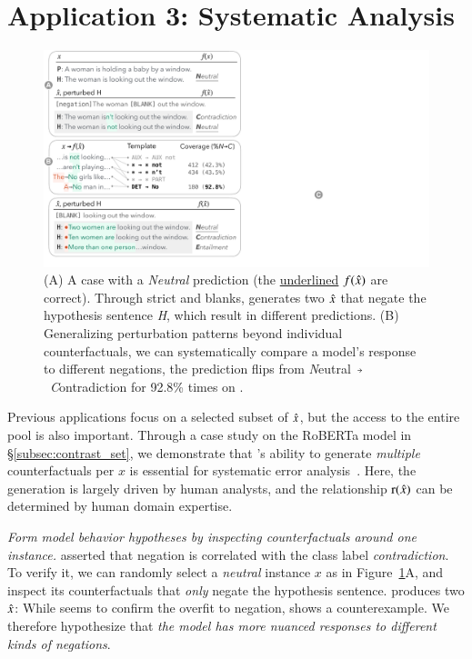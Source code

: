 \section{Application 3: Systematic Analysis}
\label{sec:app_err_analysis}


\begin{figure}[t]
\centering
\includegraphics[trim={0 12.5cm 33cm 0cm},clip,width=1\columnwidth]{figures/err_analysis.pdf}
\vspace{-15pt}
\caption{
(A) A \nli case with a \emph{Neutral} prediction (the \uline{underlined} $f(\hat{x})$ are correct).
Through strict \tagstrs and blanks, \sysname generates two $\hat{x}$ that negate the hypothesis sentence \emph{H}, which result in different predictions.
(B) Generalizing perturbation patterns beyond individual counterfactuals, we can systematically compare a model's response to different negations, \eg the prediction flips from \emph{N}eutral~$\veryshortarrow$~\emph{C}ontradiction for 92.8\% times on .
}
\vspace{-10pt}
\label{fig:err_analysis}
\end{figure}


Previous applications focus on a selected subset of $\hat{x}$, but the access to the entire pool is also important.
Through a case study on the \nli RoBERTa model in \S\ref{subsec:contrast_set}, we demonstrate that \sysname's ability to generate \emph{multiple} counterfactuals per $x$ is essential for systematic error analysis~\cite{wu2019errudite}.
Here, the generation is largely driven by human analysts, and the relationship $\operatorname*{r}(\hat{x})$ can be determined by human domain expertise.


\emph{Form model behavior hypotheses by inspecting counterfactuals around one instance.}
\citet{gururangan2018annotation} asserted that negation is correlated with the class label \emph{contradiction}. 
To verify it, we can randomly select a \emph{neutral} instance $x$ as in Figure~\ref{fig:err_analysis}A, and inspect its counterfactuals that \emph{only} negate the hypothesis sentence.
\sysname produces two $\hat{x}$:
While  seems to confirm the overfit to negation,  shows a counterexample. 
We therefore hypothesize that
\emph{the model has more nuanced responses to different kinds of negations}.%

